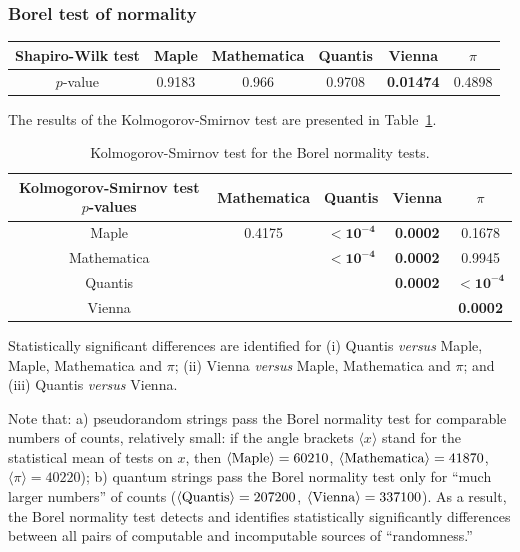 \documentclass[10pt]{article}%
\begin{document}
\subsubsection{Borel test of normality}

\begin{center}
\begin{tabular}
[c]{ c c c c c c }\hline\hline
Shapiro-Wilk test & Maple & Mathematica & Quantis & Vienna  & $\pi$\\\hline
$p$-value %
& 0.9183 & 0.966 & 0.9708 &
\bf{0.01474} & 0.4898\\\hline\hline
\end{tabular}
\end{center}

\fi

The results of the Kolmogorov-Smirnov test are presented in Table~\ref{tab:5b}.

\begin{table}
\caption{Kolmogorov-Smirnov test for the Borel normality tests.}\label{tab:5b}
 \begin{center}
 \begin{tabular}
[c]{ c c c c c }
\hline\hline
Kolmogorov-Smirnov test $p$-values & Mathematica & Quantis & Vienna & $\pi$ \\\hline
Maple & 0.4175 &$\mathbf{< 10^{-4}}$%
& \bf{0.0002}
& 0.1678\\
Mathematica &  & $\mathbf{< 10^{-4}}$%
& \bf{0.0002} & 0.9945\\
Quantis &  &  & \bf{0.0002} & $\mathbf{< 10^{-4}}$%
\\
Vienna &  &  &  & \bf{0.0002}\\\hline\hline
\end{tabular}
\end{center}
\end{table}


Statistically significant differences are identified for
(i) Quantis {\it versus}  Maple,  Maple, Mathematica and $\pi$;
(ii) Vienna {\it versus}  Maple, Mathematica and $\pi$; and
(iii) Quantis {\it versus}  Vienna.


Note that:  a) pseudorandom strings pass the Borel normality test for comparable numbers of counts, relatively small:
if the angle brackets   $\langle x \rangle$ stand for the statistical mean of tests on $x$, then
 $\langle  {\rm  Maple} \rangle  = 60210$, $\langle  {\rm  Mathematica} \rangle  = 41870$,
$\langle  \pi \rangle  = 40220$); b) quantum strings pass the Borel normality test only for ``much larger numbers''
of counts
($\langle  {\rm  Quantis} \rangle  = 207200$, $\langle  {\rm  Vienna} \rangle  = 337100$).
As a result, the Borel normality test detects and identifies
statistically significantly differences between all pairs of computable and incomputable  sources of ``randomness.''
\end{document}
